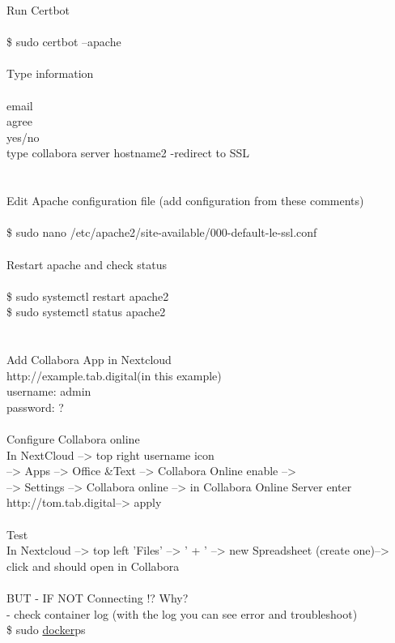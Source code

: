\documentclass[10pt,a4paper]{article}
\begin{document}
{Run Certbot\\
\\
	\$ sudo certbot --apache\\
\\
Type information\\
\\
	email\\
	agree\\
	yes/no\\
	type collabora server hostname2 -redirect to SSL\\
[eg.  tom.tab.digital  ]\\
\\
Edit Apache configuration file (add configuration from these comments)\\
\\
	\$ sudo nano /etc/apache2/site-available/000-default-le-ssl.conf}{\large \\
\\
Restart apache and check status\\
\\
	\$ sudo systemctl restart apache2\\
	\$ sudo systemctl status apache2\\
\\
\\
	Add Collabora App in Nextcloud\\
		http://example.tab.digital}{\large    (in this example) \\
		username: admin\\
		password: ?\\
		\\
	Configure Collabora online \\
		In NextCloud --> top right username icon \\
								--> Apps --> Office \&Text --> Collabora Online enable --> \\
								--> Settings --> Collabora online --> in Collabora Online Server enter http://tom.tab.digital}{\large  --> apply\\
\\
	Test\\
		In Nextcloud --> top left 'Files' --> ' + ' --> new Spreadsheet (create one)--> click and should open in Collabora\\
\\
	BUT - IF NOT Connecting !?  Why?\\
		- check container log (with the log you can see error and troubleshoot)\\
			\$ sudo \hyperlink{docker}{docker}}{\large  ps\\
}
\end{document}
